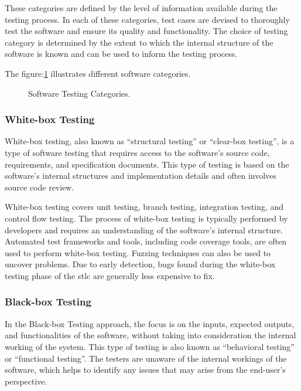 These categories are defined by the level of information available during the testing process.
In each of these categories, test cases are devised to thoroughly test the software and ensure
its quality and functionality. The choice of testing category is determined by the extent to
which the internal structure of the software is known and can be used to inform the
testing process.
\clearpage

The figure:\ref{fig:software_testing_categories} illustrates different software categories.

\begin{figure}[h]
        \centering
        \caption{Software Testing Categories\cite{jamil2016software}\cite{jovanovic2006software}.}\label{fig:software_testing_categories}
\end{figure}

\subsubsection{White-box Testing}

White-box testing, also known as ``structural testing'' or ``clear-box testing'',
is a type of software testing that requires access to the software's source code,
requirements, and specification documents. This type of testing is based on the software's
internal structures and implementation details and often involves source code
review\cite{abran2001guide}.

White-box testing covers unit testing, branch testing, integration testing, and control flow testing.
The process of white-box testing is typically performed by developers and requires an understanding
of the software's internal structure. Automated test frameworks and tools, including code coverage
tools, are often used to perform white-box testing. Fuzzing techniques can also be used to uncover
problems. Due to early detection, bugs found during the white-box testing phase of the \acrlong{stlc}
are generally less expensive to fix\cite{miller1981introduction}.


\subsubsection{Black-box Testing}
In the Black-box Testing approach, the focus is on the inputs, expected outputs, and functionalities
of the software, without taking into consideration the internal working of the system. This type of
testing is also known as  ``behavioral testing'' or  ``functional testing''. The testers are unaware
of the internal workings of the software, which helps to identify any issues that may arise
from the end-user's perspective.

